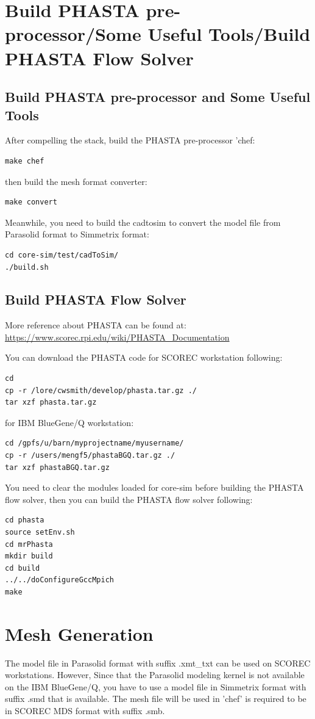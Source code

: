 \documentclass{article}
\begin{document}
\section{Build PHASTA pre-processor/Some Useful Tools/Build PHASTA Flow Solver}
\label{ch:2}
\subsection{Build PHASTA pre-processor and Some Useful Tools}

After compelling the stack, build the PHASTA pre-processor 'chef:
\begin{lstlisting}
make chef
\end{lstlisting}

then build the mesh format converter:
\begin{lstlisting}
make convert 
\end{lstlisting}

Meanwhile, you need to build the cadtosim to convert the model file from Parasolid format to Simmetrix format:
\begin{lstlisting}
cd core-sim/test/cadToSim/ 
./build.sh 
\end{lstlisting}

\subsection{Build PHASTA Flow Solver}

More reference about PHASTA can be found at:\\
\url{https://www.scorec.rpi.edu/wiki/PHASTA_Documentation} 

You can download the PHASTA code for SCOREC workstation following:
\begin{lstlisting}
cd 
cp -r /lore/cwsmith/develop/phasta.tar.gz ./
tar xzf phasta.tar.gz
\end{lstlisting}
for IBM BlueGene/Q workstation:
\begin{lstlisting}
cd /gpfs/u/barn/myprojectname/myusername/
cp -r /users/mengf5/phastaBGQ.tar.gz ./
tar xzf phastaBGQ.tar.gz
\end{lstlisting}
You need to clear the modules loaded for core-sim before building the PHASTA flow solver, then you can build the PHASTA flow solver following:
\begin{lstlisting}
cd phasta
source setEnv.sh
cd mrPhasta
mkdir build
cd build
../../doConfigureGccMpich
make
\end{lstlisting}


\section{Mesh Generation}
\label{ch:3}
The model file in Parasolid format with suffix .xmt\_txt can be used on SCOREC workstations. However, Since that the Parasolid modeling kernel is not available on the IBM BlueGene/Q, you have to use a model file in Simmetrix format with suffix .smd that is available. The mesh file will be used in 'chef' is required to be in SCOREC MDS format with suffix .smb.
\end{document}
